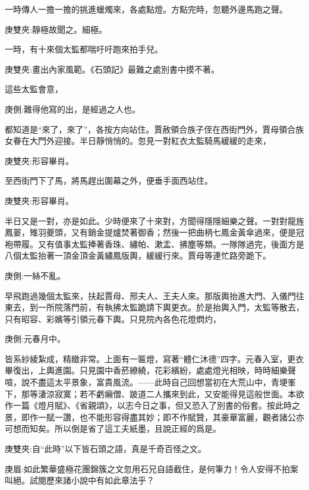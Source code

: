 \begin{parag}
    一時傳人一擔一擔的挑進蠟燭來，各處點燈。方點完時，忽聽外邊馬跑之聲。\begin{note}庚雙夾:靜極故聞之。細極。\end{note} 一時，有十來個太監都喘吁吁跑來拍手兒。\begin{note}庚雙夾:畫出內家風範。《石頭記》最難之處別書中摸不著。\end{note}這些太監會意，\begin{note}庚側:難得他寫的出，是經過之人也。\end{note}都知道是“來了，來了”，各按方向站住。賈赦領合族子侄在西街門外，賈母領合族女眷在大門外迎接。半日靜悄悄的。忽見一對紅衣太監騎馬緩緩的走來，\begin{note}庚雙夾:形容畢肖。\end{note}至西街門下了馬，將馬趕出圍幕之外，便垂手面西站住。\begin{note}庚雙夾:形容畢肖。\end{note}半日又是一對，亦是如此。少時便來了十來對，方聞得隱隱細樂之聲。一對對龍旌鳳翣，雉羽夔頭，又有銷金提爐焚著御香；然後一把曲柄七鳳金黃傘過來，便是冠袍帶履。又有值事太監捧著香珠、繡帕、漱盂、拂塵等類。一隊隊過完，後面方是八個太監抬著一頂金頂金黃繡鳳版輿，緩緩行來。賈母等連忙路旁跪下。 \begin{note}庚側:一絲不亂。\end{note}早飛跑過幾個太監來，扶起賈母、邢夫人、王夫人來。那版輿抬進大門、入儀門往東去，到一所院落門前，有執拂太監跪請下輿更衣。於是抬輿入門，太監等散去，只有昭容、彩嬪等引領元春下輿。只見院內各色花燈熌灼，\begin{note}庚側:元春月中。 \end{note}皆系紗綾紮成，精緻非常。上面有一匾燈，寫著“體仁沐德”四字。元春入室，更衣畢復出，上輿進園。只見園中香菸繚繞，花彩繽紛，處處燈光相映，時時細樂聲喧，說不盡這太平景象，富貴風流。——此時自己回想當初在大荒山中，青埂峯下，那等淒涼寂寞；若不虧癩僧、跛道二人攜來到此，又安能得見這般世面。本欲作一篇《燈月賦》、《省親頌》，以志今日之事，但又恐入了別書的俗套。按此時之景，即作一賦一讚，也不能形容得盡其妙；即不作賦贊，其豪華富麗，觀者諸公亦可想而知矣。所以倒是省了這工夫紙墨，且說正經的爲是。\begin{note}庚雙夾:自“此時”以下皆石頭之語，真是千奇百怪之文。\end{note}\begin{note}庚眉:如此繁華盛極花團錦簇之文忽用石兄自語截住，是何筆力！令人安得不拍案叫絕。試閱歷來諸小說中有如此章法乎？\end{note}
\end{parag}


